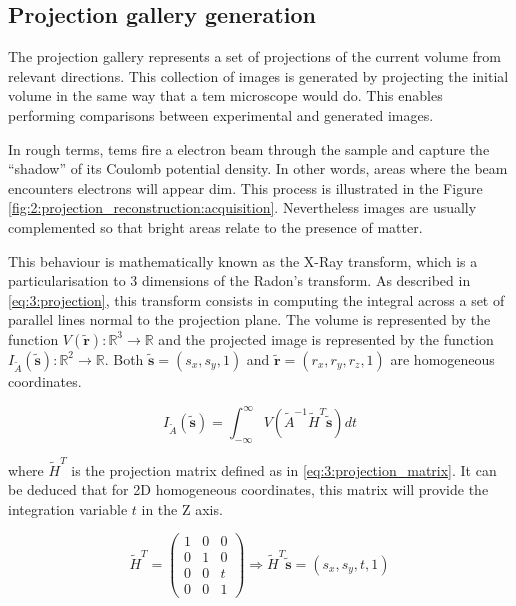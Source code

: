 \documentclass[../main.tex]{subfiles}
\begin{document}
\subsection{Projection gallery generation}
The projection gallery represents a set of projections of the current volume from relevant directions. This collection of images is generated by projecting the initial volume in the same way that a \gls{tem} microscope would do. This enables performing comparisons between experimental and generated images. 

In rough terms, \glspl{tem} fire a electron beam through the sample and capture the ``shadow'' of its Coulomb potential density\cite{sorzano2022}. In other words, areas where the beam encounters electrons will appear dim. This process is illustrated in the Figure \ref{fig:2:projection_reconstruction:acquisition}. Nevertheless images are usually complemented so that bright areas relate to the presence of matter.

This behaviour is mathematically known as the X-Ray transform, which is a particularisation to 3 dimensions of the Radon's transform. As described in \eqref{eq:3:projection}, this transform consists in computing the integral across a set of parallel lines normal to the projection plane. The volume is represented by the function $V(\bm{\tilde{r}}): \mathbb{R}^3 \rightarrow \mathbb{R}$ and the projected image is represented by the function $I_{\tilde{A}}(\bm{\tilde{s}}): \mathbb{R}^2 \rightarrow \mathbb{R}$. Both $\bm{\tilde{s}} = (s_x, s_y, 1)$ and $\bm{\tilde{r}} = (r_x, r_y, r_z, 1)$ are homogeneous coordinates\cite{sorzano2017b}.

\begin{equation}\label{eq:3:projection}
    I_{\tilde{A}}(\bm{\tilde{s}}) =
    \int_{-\infty}^{\infty} V(\tilde{A}^{-1}\tilde{H}^T\bm{\tilde{s}}) dt
\end{equation}

where $\tilde{H}^T$ is the projection matrix defined as in \eqref{eq:3:projection_matrix}. It can be deduced that for 2D homogeneous coordinates, this matrix will provide the integration variable $t$ in the Z axis.

\begin{equation}\label{eq:3:projection_matrix}
    \tilde{H}^T = 
    \begin{pmatrix}
        1 & 0 & 0 \\
        0 & 1 & 0 \\
        0 & 0 & t \\
        0 & 0 & 1
    \end{pmatrix}
    \Rightarrow
    \tilde{H}^T \bm{\tilde{s}} =
    (s_x, s_y, t, 1)
\end{equation}
\end{document}
